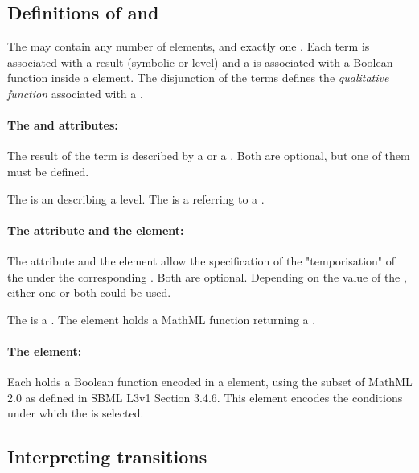 \bigskip
\subsection*{Definitions of  and } %
The  may contain any number of  elements, and exactly one . Each term is associated with a result (symbolic or level) and a  is associated with a Boolean function inside a  element. The disjunction of the terms defines the \emph{qualitative function} associated with a .

\paragraph{The  and  attributes:}
The result of the term is described by a  or a . Both are optional, but one of them must be defined.

The  is an  describing a level. The  is a  referring to a .

\paragraph{The  attribute and the  element:}
The attribute  and the element  allow the specification of the "temporisation" of the  under the corresponding . Both are optional. Depending on the value of the , either one or both could be used.

The  is a . The element  holds a MathML function returning a . 

\paragraph{The  element:}
Each  holds a Boolean function encoded in a  element, using the subset of MathML 2.0 as defined in SBML L3v1 Section 3.4.6.
This element encodes the conditions under which the  is selected.


\bigskip
\subsection*{\hypertarget{inter_trans}{Interpreting transitions}} %

